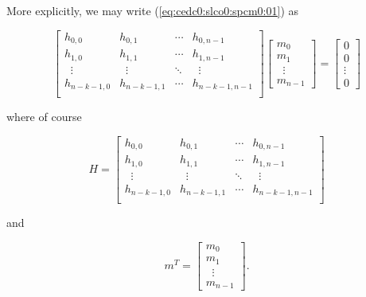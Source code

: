 \noindent{}More explicitly, we may write (\ref{eq:cedc0:slco0:spcm0:01})
as

\begin{equation}
\label{eq:cedc0:slco0:spcm0:02}
\left[\begin{array}{llcl}
         h_{0,0} & h_{0,1} & \cdots{} & h_{0,n-1}         \\
         h_{1,0} & h_{1,1} & \cdots{} & h_{1,n-1}         \\
         \;\;\vdots  & \;\;\vdots  & \ddots{} & \;\;\vdots            \\
         h_{n-k-1,0} & h_{n-k-1,1} & \cdots{} & h_{n-k-1,n-1}         \\
\end{array}\right]
\left[\begin{array}{l}m_0\\m_1\\\;\;\vdots{}\\m_{n-1}\end{array}\right]
 = \left[\begin{array}{c}0\\0\\\vdots{}\\0\end{array}\right]  
\end{equation}

\noindent{}where of course

\begin{equation}
\label{eq:cedc0:slco0:spcm0:03}
H = \left[\begin{array}{llcl}
         h_{0,0} & h_{0,1} & \cdots{} & h_{0,n-1}         \\
         h_{1,0} & h_{1,1} & \cdots{} & h_{1,n-1}         \\
         \;\;\vdots  & \;\;\vdots  & \ddots{} & \;\;\vdots            \\
         h_{n-k-1,0} & h_{n-k-1,1} & \cdots{} & h_{n-k-1,n-1}         \\
\end{array}\right]
\end{equation}

\noindent{}and

\begin{equation}
\label{eq:cedc0:slco0:spcm0:04}
m^T = 
\left[\begin{array}{l}m_0\\m_1\\\;\;\vdots{}\\m_{n-1}\end{array}\right] .
\end{equation}

